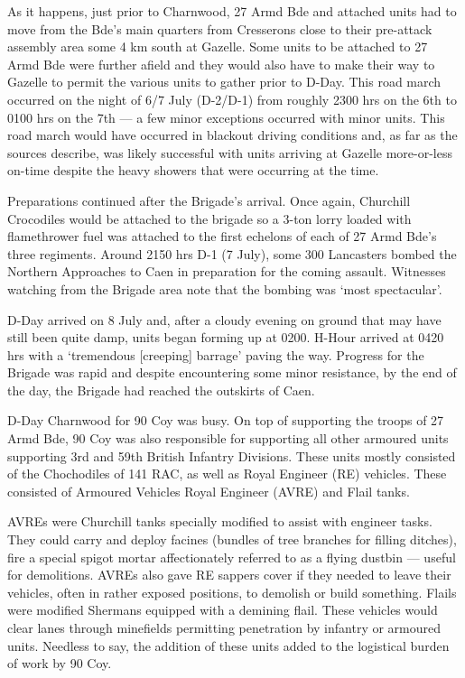\documentclass[noraggedright]{turabian-researchpaper}
\newcommand{\CharnAdm}{27 Armd Bde Adm Order No. 7, 7 July 1944}
\begin{document}
As it happens, just prior to Charnwood, 27 Armd Bde and attached units
had to move from the Bde's main quarters from Cresserons close to their 
pre-attack assembly area some 4 km south at Gazelle.  Some units to be 
attached to 27 Armd Bde were further afield and they would also have to
make their way to Gazelle to permit the various units to gather prior to 
D-Day.  This road march occurred on the night of 6/7 July (D-2/D-1) from
roughly 2300 hrs on the 6th to 0100 hrs on the 7th --- a few minor exceptions
occurred with minor units.\autocite[Appendix C, 27 Armd Bde Operation Order 
No 2, 6 July 1944]{27wd}  This road march would have occurred in
blackout driving conditions and, as far as the sources describe, was likely
successful with units arriving at Gazelle more-or-less on-time despite the
heavy showers that were occurring at the time.\autocite[6 June 1944]{1raf}

Preparations continued after the Brigade's arrival.  Once again, Churchill
Crocodiles would be attached to the brigade so a 3-ton lorry loaded with 
flamethrower fuel was attached to the first echelons of each of 27 Armd Bde's
three regiments.\autocite[7 July 1944]{90wd}  Around 2150 hrs D-1 (7 July), 
some 300 Lancasters bombed the Northern Approaches to Caen in preparation 
for the coming assault. Witnesses watching from the Brigade area note that 
the bombing was `most spectacular'.\autocite[7 July 1944]{27wd} 

D-Day arrived on 8 July and,
after a cloudy evening on ground that may have still been quite damp, 
units began forming up at 0200. 
H-Hour arrived at 0420 hrs with a `tremendous [creeping] barrage' paving the 
way.\autocite[8 July 1944]{27wd}  Progress for the Brigade was rapid and
despite encountering some minor resistance, by the end of the day, the 
Brigade had reached the outskirts of Caen.\autocite[8 July 1944]{27wd}

D-Day Charnwood for 90 Coy was busy.  On top of supporting the troops of
27 Armd Bde, 90 Coy was also responsible for supporting all other armoured
units supporting 3rd and 59th British Infantry Divisions.\autocite
[\CharnAdm][Para. 3]{27wd}  These units mostly consisted of the Chochodiles
of 141 RAC, as well as Royal Engineer (RE) vehicles.  These consisted of 
Armoured Vehicles Royal Engineer (AVRE) and Flail tanks.  

AVREs were 
Churchill tanks specially modified to assist with engineer tasks.  They
could carry and deploy facines (bundles of tree branches for filling
ditches), fire a special spigot mortar affectionately referred to as a 
flying dustbin --- useful for demolitions.  AVREs also gave RE sappers 
cover if they needed to leave their vehicles, often in rather exposed 
positions, to demolish or build something.  
Flails were modified Shermans equipped with a demining flail.  These
vehicles would clear lanes through minefields permitting penetration by
infantry or armoured units.  Needless to say, the addition of these
units added to the logistical burden of work by 90 Coy. 
\end{document}
